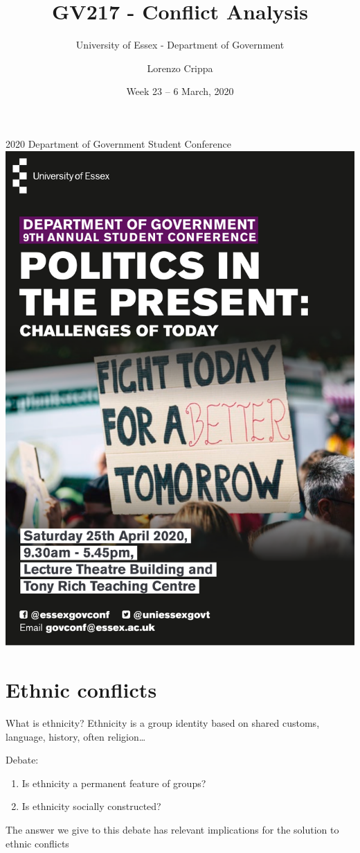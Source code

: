 \documentclass[xcolor=table]{beamer}
\title{GV217 - Conflict Analysis}
\subtitle{University of Essex - Department of Government}
\date{Week 23 -- 6 March, 2020}				%
\author{Lorenzo Crippa}
\begin{document}
\frame{
\titlepage
}

\begin{frame}{2020 Department of Government Student Conference}
\centering
\includegraphics[scale=0.35]{pictures/week_23_conference.pdf} 
\end{frame}

\section{Ethnic conflicts}

\begin{frame}{What is ethnicity?}
Ethnicity is a group identity based on shared customs, language, history, often religion\ldots \pause

Debate: \pause
\begin{enumerate}
\item Is ethnicity a permanent feature of groups? \pause
\item Is ethnicity socially constructed? \pause
\end{enumerate}

The answer we give to this debate has relevant implications for the solution to ethnic conflicts
\end{frame}
\end{document}
